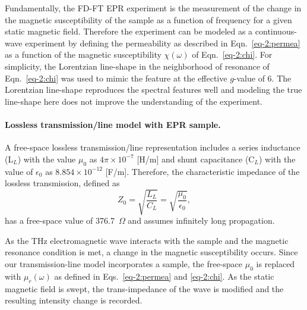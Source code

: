 Fundamentally, the FD-FT EPR experiment is the measurement of the change in the magnetic susceptibility of the sample as a function of frequency for a given static magnetic field. Therefore the experiment can be modeled as a continuous-wave experiment by defining the permeability as described in Eqn.~\ref{eq-2:permea} as a function of the magnetic susceptibility $\chi(\omega)$ of Eqn.~\ref{eq-2:chi}. For simplicity, the Lorentzian line-shape in the neighborhood of resonance of Eqn.~\ref{eq-2:chi} was used to mimic the feature at the effective $g$-value of 6. The Lorentzian line-shape reproduces the spectral features well and modeling the true line-shape here does not improve the understanding of the experiment. 

\noindent \paragraph*{Lossless transmission\-/line model with EPR sample.} A free-space lossless transmission\-/line representation includes a series inductance (L$_L$) with the value $\mu_0$ as $4 \pi \times 10^{-7}$ [H/m] and shunt capacitance (C$_L$) with the value of $\epsilon_0$ as $8.854 \times 10^{-12}$ [F/m]. \cite{ramo1984fields} Therefore, the characteristic impedance of the lossless transmission, defined as
\begin{equation}
    Z_0 = \sqrt{\frac{L_L}{C_L}} = \sqrt{\frac{\mu_0}{\epsilon_0}},
\end{equation}
has a free-space value of 376.7~$\Omega$ and assumes infinitely long propagation. 

As the THz electromagnetic wave interacts with the sample and the magnetic resonance condition is met, a change in the magnetic susceptibility occurs. Since our transmission-line model incorporates a sample, the free-space $\mu_0$ is replaced with $\mu_r(\omega)$ as defined in Eqs.~\ref{eq-2:permea} and \ref{eq-2:chi}. As the static magnetic field is swept, the trans-impedance of the wave is modified and the resulting intensity change is recorded.

